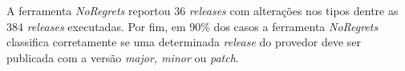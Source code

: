 A ferramenta \textit{NoRegrets} reportou 36 \textit{releases} com alterações nos tipos dentre as 384 \textit{releases} executadas. Por fim, em 90\% dos casos a ferramenta \textit{NoRegrets} classifica corretamente se uma determinada \textit{release} do provedor deve ser publicada com a versão \textit{major, minor} ou \textit{patch}.